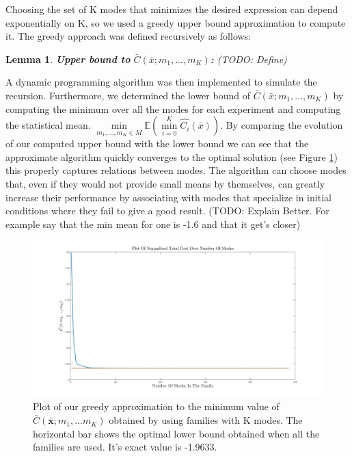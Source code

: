 \documentclass[12,twoside]{TFG-GM}
\newtheorem{lemma}[theorem]{Lemma}
\theoremstyle{definition}
\theoremstyle{remark}
\newcommand*\diff[1]{\bar{#1}}
\begin{document}
Choosing the set of K modes that minimizes the desired expression can depend exponentially on K, so we used a greedy upper bound approximation to compute it. The greedy approach was defined recursively as follows:
\begin{lemma}\textbf{Upper bound to } $ \bar{C}(\diff{x}; m_1, ..., m_K)$\textbf{:}
(TODO: Define)
\end{lemma}
A dynamic programming algorithm was then implemented to simulate the recursion. Furthermore, we determined the lower bound of $ \bar{C}(\diff{x}; m_1, ..., m_K)$ by computing the minimum over all the modes for each experiment and computing the statistical mean.  $\min\limits_{m_1, ..., m_K \in M}\mathbb{E}(\min\limits_{i = 0}^{K}{\hat{C_i}(\diff{x})})$. By comparing the evolution of our computed upper bound with the lower bound we can see that the approximate algorithm quickly converges to the optimal solution (see Figure \ref{fig:cost_over_modes}) this properly captures relations between modes. The algorithm can choose modes that, even if they would not provide small means by themselves, can greatly increase their performance by associating with modes that specialize in initial conditions where they fail to give a good result. (TODO: Explain Better. For example say that the min mean for one is -1.6 and that it get's closer)

\begin{figure}[htb!]
\begin{center}
\includegraphics[width=16cm]{cost_over_modes.jpg}
\caption{\label{fig:cost_over_modes} \small Plot of our greedy approximation to the minimum value of $\diff{C}(\diff{\textbf{x}}; m_1, ... m_K)$ obtained by using families with K modes. The horizontal bar shows the optimal lower bound obtained when all the families are used. It's exact value is -1.9633.}
\end{center}
\end{figure}
\end{document}
